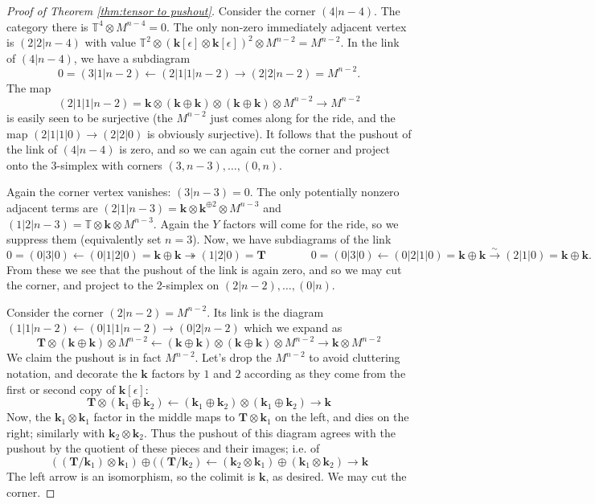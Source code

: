 \documentclass{article}
\theoremstyle{definition}
\begin{document}
\begin{proof}[Proof of Theorem \ref{thm:tensor to pushout}]
    Consider the corner $(4|n-4)$.  The category there is $\mathbb{T}^4 \otimes M^{n-4}=0$.  The only non-zero immediately adjacent vertex is $(2|2|n-4)$ with value $\mathbb{T}^2  \otimes (\mathbf{k}[\epsilon] \otimes \mathbf{k}[\epsilon])^2 \otimes M^{n-2} = M^{n-2}$.  In the link of $(4|n-4)$, we have a subdiagram 
    $$0 = (3|1|n-2) \leftarrow  (2|1|1|n-2) \rightarrow  (2|2|n-2) = M^{n-2}.$$  The map 
    $$(2|1|1|n-2) = \mathbf{k} \otimes (\mathbf{k} \oplus \mathbf{k}) \otimes (\mathbf{k} \oplus \mathbf{k})  \otimes M^{n-2} \to M^{n-2}$$ is easily seen to be surjective (the $M^{n-2}$ just comes along for the ride, and the map $(2|1|1|0) \to (2|2|0)$ is obviously surjective).  It follows that the pushout of the link of $(4|n-4)$ is zero, and so we can again cut the corner and project onto the 3-simplex with corners $(3, n-3),\ldots, (0,n)$.

    Again the corner vertex vanishes: $(3|n-3) = 0$. The only potentially nonzero adjacent terms are $(2|1|n-3) = \mathbf{k} \otimes \mathbf{k}^{\oplus 2} \otimes M^{n-3}$ and $(1|2|n-3) = \mathbb{T} \otimes \mathbf{k} \otimes M^{n-3}$.  Again the $Y$ factors will come for the ride, so we suppress them (equivalently set $n=3$).   Now, 
    we have subdiagrams of the link 
    $$0 = (0|3| 0) \leftarrow (0|1|2|0) = \mathbf{k} \oplus \mathbf{k}  \twoheadrightarrow (1|2|0) = \mathbf{T} \qquad \qquad 0 = (0|3|0) \leftarrow (0|2|1|0) = \mathbf{k} \oplus \mathbf{k} \xrightarrow{\sim} (2|1|0) = \mathbf{k} \oplus \mathbf{k}. $$
    From these we see that the pushout of the link is again zero, and so we may cut the corner, and project to the 2-simplex on $(2| n-2), \ldots, (0|n)$. 

    Consider the corner $(2|n-2) = M^{n-2}$.  Its link is the diagram $(1|1|n-2) \leftarrow (0|1|1|n-2) \rightarrow (0|2|n-2)$ which we expand as
    $$\mathbf{T} \otimes (\mathbf{k} \oplus \mathbf{k}) \otimes M^{n-2} \leftarrow (\mathbf{k} \oplus \mathbf{k}) \otimes (\mathbf{k} \oplus \mathbf{k}) \otimes M^{n-2} \rightarrow \mathbf{k} \otimes  M^{n-2}$$
    We claim the pushout is in fact $M^{n-2}$.  Let's drop the $M^{n-2}$ to avoid cluttering notation, and decorate the $\mathbf{k}$ factors by $1$ and $2$ according as they come from the first or second copy of $\mathbf{k}[\epsilon]$:
    $$\mathbf{T} \otimes (\mathbf{k}_1 \oplus \mathbf{k}_2)  \leftarrow (\mathbf{k}_1 \oplus \mathbf{k}_2) \otimes (\mathbf{k}_1 \oplus \mathbf{k}_2) \rightarrow \mathbf{k} $$
    Now, the $\mathbf{k}_1 \otimes \mathbf{k}_1$ factor in the middle maps to $\mathbf{T} \otimes \mathbf{k}_1$ on the left, and dies on the right; similarly with $\mathbf{k}_2 \otimes \mathbf{k}_2$.  
    Thus the pushout of this diagram agrees with the pushout by the quotient of these pieces and their images; i.e. of 
    $$((\mathbf{T}/\mathbf{k}_1) \otimes \mathbf{k}_1) \oplus ((\mathbf{T} /\mathbf{k}_2)  \leftarrow 
    (\mathbf{k}_2 \otimes \mathbf{k}_1) \oplus (\mathbf{k}_1 \otimes \mathbf{k}_2)\rightarrow \mathbf{k}$$
    The left arrow is an isomorphism, so the colimit is $\mathbf{k}$, as desired.  We may cut the corner. 


\end{proof}
\end{document}
